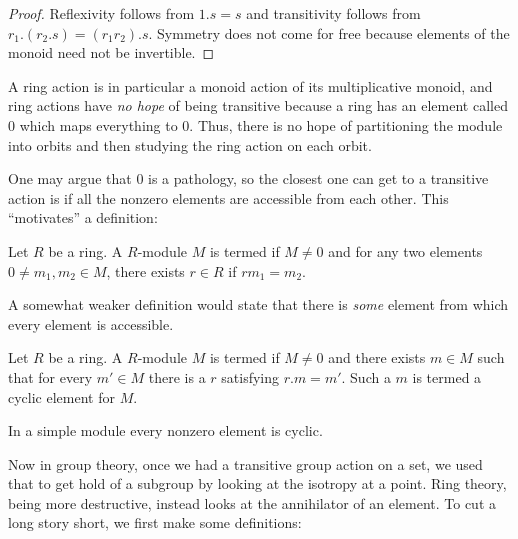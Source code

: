 \documentclass[a4paper]{amsart}
\begin{document}
\begin{proof}
  Reflexivity follows from $1.s = s$ and transitivity follows from
  $r_1.(r_2.s) = (r_1r_2).s$. Symmetry does not come for free because
  elements of the monoid need not be invertible.
\end{proof}

A ring action is in particular a monoid action of its multiplicative
monoid, and ring actions have {\em no hope} of being transitive
because a ring has an element called $0$ which maps everything to
$0$. Thus, there is no hope of partitioning the module into orbits and
then studying the ring action on each orbit.

One may argue that $0$ is a pathology, so the closest one can get to a
transitive action is if all the nonzero elements are accessible from
each other. This ``motivates'' a definition:

\begin{definer}
  Let $R$ be a ring. A $R$-module $M$ is termed
   if $M \ne 0$ and for any two
  elements $0 \ne m_1, m_2 \in M$, there exists $r \in R$ if $rm_1 = m_2$.
\end{definer}

A somewhat weaker definition would state that there is {\em some}
element from which every element is accessible.

\begin{definer}
  Let $R$ be a ring. A $R$-module $M$ is termed
   if $M \ne 0$ and there exists $m
  \in M$ such that for every $m' \in M$ there is a $r$ satisfying $r.m
  = m'$. Such a $m$ is termed a cyclic element for $M$.
\end{definer}

In a simple module every nonzero element is cyclic.

Now in group theory, once we had a transitive group action on a set,
we used that to get hold of a subgroup by looking at the isotropy at a
point. Ring theory, being more destructive, instead looks at the
annihilator of an element. To cut a long story short, we first make
some definitions:
\end{document}
